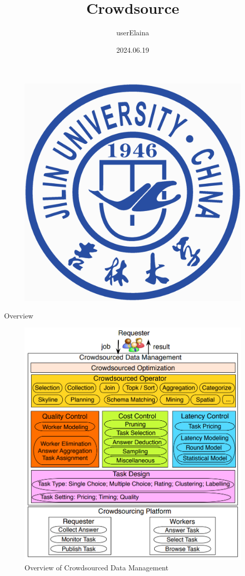 \documentclass{beamer}
\author{userElaina}
\title{Crowdsource}
\institute{School of AI}
\date{2024.06.19}
\begin{document}
\kaishu
\begin{frame}
    \titlepage
    \begin{figure}[htpb]
        \begin{center}
            \includegraphics[width=0.15\linewidth]{pic/Jilin_University_Logo.eps}
        \end{center}
    \end{figure}
\end{frame}



\begin{frame}{Overview}
    \begin{figure}[c]
        \centering
        \includegraphics[height=.8\textheight]{pic/1.png}
        \caption{Overview of Crowdsourced Data Management}
    \end{figure}
\end{frame}
\end{document}
